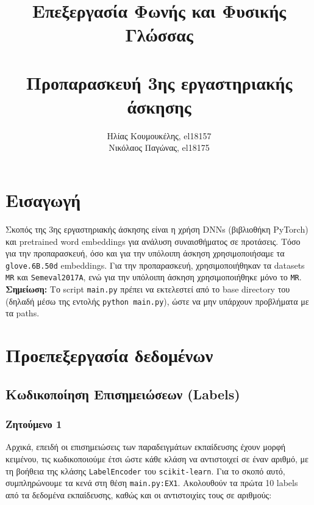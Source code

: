 \documentclass[a4paper, 12pt]{article}
\title{
	\textbf{Επεξεργασία Φωνής και Φυσικής Γλώσσας} \\~\\
	Προπαρασκευή 3ης εργαστηριακής άσκησης
}
\author{
	Ηλίας Κουμουκέλης, el18157 \\
	Νικόλαος Παγώνας, el18175
}
\date{}
\begin{document}
\maketitle

\section*{Εισαγωγή}
    Σκοπός της 3ης εργαστηριακής άσκησης είναι η χρήση DNNs (βιβλιοθήκη PyTorch) και pretrained word embeddings για ανάλυση συναισθήματος σε προτάσεις. Τόσο για την προπαρασκευή, όσο και για την υπόλοιπη άσκηση χρησιμοποιήσαμε τα \verb|glove.6B.50d| embeddings. Για την προπαρασκευή, χρησιμοποιήθηκαν τα datasets \verb|MR| και \verb|Semeval2017A|, ενώ για την υπόλοιπη άσκηση χρησιμοποιήθηκε μόνο το \verb|MR|. \\
    \textbf{Σημείωση:} Το script \verb|main.py| πρέπει να εκτελεστεί από το base directory του (δηλαδή μέσω της εντολής \verb|python main.py|), ώστε να μην υπάρχουν προβλήματα με τα paths.

\section{Προεπεξεργασία δεδομένων}

    \subsection{Κωδικοποίηση Επισημειώσεων (Labels)}

        \subsubsection*{Ζητούμενο 1}
            Αρχικά, επειδή οι επισημειώσεις των παραδειγμάτων εκπαίδευσης έχουν μορφή κειμένου, τις κωδικοποιούμε έτσι ώστε κάθε κλάση να αντιστοιχεί σε έναν αριθμό, με τη βοήθεια της κλάσης \verb|LabelEncoder| του \verb|scikit-learn|. Για το σκοπό αυτό, συμπληρώνουμε τα κενά στη θέση \verb|main.py:EX1|. Ακολουθούν τα πρώτα 10 labels από τα δεδομένα εκπαίδευσης, καθώς και οι αντιστοιχίες τους σε αριθμούς:
            
\end{document}

